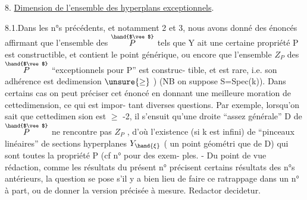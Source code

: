 
8. \uline{Dimension de l'ensemble des hyperplans exceptionnels}.

8.1.Dans les n°s précédents, et notamment 2 et 3, nous avons donné des
énoncés affirmant que l'ensemble des \hand{$\xi\in$} $\overset{\hand{$\vee$}}{P}$ tels que Y ait une certaine
propriété P est constructible, et contient le point générique\inserted{\unsure{$\overset{\vee}{\ }$}}\hand{/},  ou
encore que l'ensemble $Z_P$ des \hand{$\xi\in$} $\overset{\hand{$\vee$}}{P}$ ``exceptionnels pour P'' est construc-%
tible, et est rare, i.e. son adhérence est dedimension $\unsure{\geq}$ ) 
(NB on suppose S=Spec(k)). Dans certains cas on peut préciser cet énoncé
en donnant une meilleure moration de cettedimension, ce qui est impor-%
tant  diverses questions. Par exemple, lorsqu'on sait que cettedimen
sion est $\geq$ -2, il s'ensuit qu'une droite ``assez générale'' D de $\overset{\hand{$\vee$}}{P}$
ne rencontre pas $Z_P$ , d'où l'existence (si k est infini) de ``pinceaux
linéaires'' de sections hyperplanes  $Y_{\hand{\xi}}$ (\hand{$\xi$} un point géométri
que de D) qui sont toutes la propriété P (cf n°  pour des exem-%
ples. - Du point de vue rédaction, comme les résultats du présent n°
précisent certains résultats des n°s antérieurs, la question se pose s'il
y a bien lieu de faire ce ratrappage dans un n° à part, ou de donner la
version précisée à mesure. Redactor decidetur.


